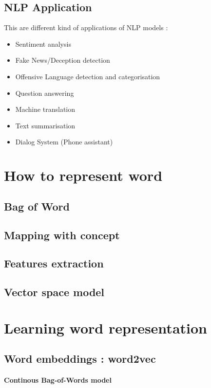 			\subsection{NLP Application}
				This are different kind of applications of NLP models :
				\begin{itemize}
					\item Sentiment analysis
					\item Fake News/Deception detection
					\item Offensive Language detection and categorisation
					\item Question answering
					\item Machine translation
					\item Text summarisation
					\item Dialog System (Phone assistant)
				\end{itemize}

	\section{How to represent word}

		\subsection{Bag of Word}

		\subsection{Mapping with concept}

		\subsection{Features extraction}

		\subsection{Vector space model}

	\section{Learning word representation}

		\subsection{Word embeddings : word2vec}
			\paragraph*{Continous Bag-of-Words model}

